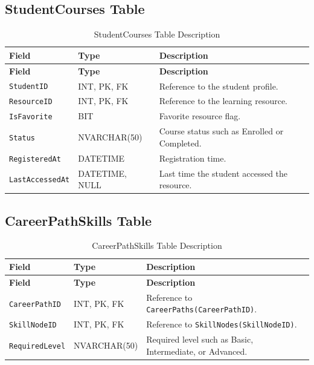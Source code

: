 \subsection{StudentCourses Table}

\begin{longtable}{|>{\raggedright\arraybackslash}m{2.9cm}|>{\raggedright\arraybackslash}m{3.45cm}|>{\raggedright\arraybackslash}m{4.95cm}|}
\caption{StudentCourses Table Description}
\label{tab:student_courses_table_description}
\\
\hline
\textbf{Field} & \textbf{Type} & \textbf{Description} \\
\hline
\endfirsthead
\hline
\textbf{Field} & \textbf{Type} & \textbf{Description} \\
\hline
\endhead
\texttt{StudentID} & INT, PK, FK & Reference to the student profile. \\
\hline
\texttt{ResourceID} & INT, PK, FK & Reference to the learning resource. \\
\hline
\texttt{IsFavorite} & BIT & Favorite resource flag. \\
\hline
\texttt{Status} & NVARCHAR(50) & Course status such as Enrolled or Completed. \\
\hline
\texttt{RegisteredAt} & DATETIME & Registration time. \\
\hline
\texttt{LastAccessedAt} & DATETIME, NULL & Last time the student accessed the resource. \\
\hline
\end{longtable}

\subsection{CareerPathSkills Table}

\begin{longtable}{|>{\raggedright\arraybackslash}m{2.9cm}|>{\raggedright\arraybackslash}m{3.45cm}|>{\raggedright\arraybackslash}m{4.95cm}|}
\caption{CareerPathSkills Table Description}
\label{tab:career_path_skills_table_description}
\\
\hline
\textbf{Field} & \textbf{Type} & \textbf{Description} \\
\hline
\endfirsthead
\hline
\textbf{Field} & \textbf{Type} & \textbf{Description} \\
\hline
\endhead
\texttt{CareerPathID} & INT, PK, FK & Reference to \texttt{CareerPaths(CareerPathID)}. \\
\hline
\texttt{SkillNodeID} & INT, PK, FK & Reference to \texttt{SkillNodes(SkillNodeID)}. \\
\hline
\texttt{RequiredLevel} & NVARCHAR(50) & Required level such as Basic, Intermediate, or Advanced. \\
\hline
\end{longtable}

